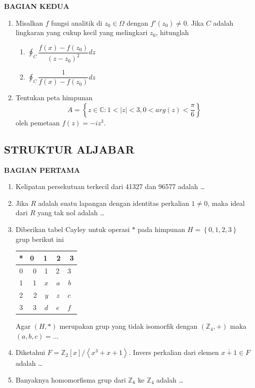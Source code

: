 \documentclass[12pt,twoside]{article}
\begin{document}
\newpage \textbf{BAGIAN KEDUA}
\begin{enumerate}
	\item Misalkan $f$ fungsi analitik di $z_0 \in \Omega $ dengan $f'(z_0) \neq 0$. Jika $C$ adalah lingkaran yang cukup kecil yang melingkari $z_0$, hitunglah
	      \begin{enumerate}
		      \item $\displaystyle\oint_C \dfrac{f(x)-f(z_0)}{(z-z_0)^2} dz$
		      \item $\displaystyle\oint_C \dfrac{1}{f(x)-f(z_0)} dz$
	      \end{enumerate}

	\item Tentukan peta himpunan
	      \begin{equation*}
		      A = \left\lbrace z \in \mathbb{C} : 1 < |z| < 3,0 < arg(z) < \dfrac{\pi}{6} \right\rbrace
	      \end{equation*}
	      oleh pemetaan $f(z)=-iz^3$.
\end{enumerate}



\newpage \subsection{STRUKTUR ALJABAR}

\textbf{BAGIAN PERTAMA}
\begin{enumerate}
	\item Kelipatan persekutuan terkecil dari 41327 dan 96577 adalah \dots

	\item Jika $R$ adalah suatu lapangan dengan identitas perkalian $1 \neq 0 $, maka ideal dari $R$ yang tak nol adalah \dots

	\item Diberikan tabel Cayley untuk operasi $*$ pada himpunan $H = \left\lbrace 0,1,2,3 \right\rbrace$ grup berikut ini
	      \begin{center}

		      \begin{tabular}{|c|c|}
			      \hline
			      * & 0 ~ 1 ~ 2 ~ 3       \\
			      \hline
			      0 & 0 ~ 1 ~ 2 ~ 3       \\
			      \hline
			      1 & 1 ~ $x$ ~ $a$ ~ $b$ \\
			      \hline
			      2 & 2 ~ $y$ ~ $z$ ~ $c$ \\
			      \hline
			      3 & 3 ~ $d$ ~ $e$ ~ $f$ \\
			      \hline
		      \end{tabular}

	      \end{center}
	      Agar $(H,*)$ merupakan grup yang tidak isomorfik dengan $(\mathbb{Z}_4, +)$ maka $(a,b,c) = \dots$

	\item Diketahui $F = \mathbb{Z}_2 [x] / \left< x^3 + x+1 \right>$. Invers perkalian dari elemen $\overline{x+1} \in F$ adalah \dots

	\item Banyaknya homomorfisma grup dari $\mathbb{Z}_6 $ ke $\mathbb{Z}_4$ adalah \dots
\end{enumerate}
\end{document}
